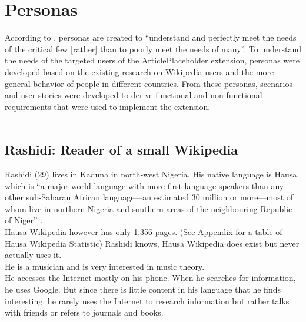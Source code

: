 \chapter{Personas}

According to \citet[182]{design:01}, personas are created to ``understand and perfectly meet the needs of the critical few [rather] than to poorly meet the needs of many''. To understand the needs of the targeted users of the ArticlePlaceholder extension, personas were developed based on the existing research on Wikipedia users \citep{wiki:37} and the more general behavior of people in different countries. From these personas, scenarios and user stories were developed to derive functional and non-functional requirements that were used to implement the extension. \\
\\
\section{Rashidi: Reader of a small Wikipedia}
Rashidi (29) lives in Kaduna in north-west Nigeria. His native language is Hausa, which is ``a major world language with more first-language speakers than any other sub-Saharan African language---an estimated 30 million or more---most of whom live in northern Nigeria and southern areas of the neighbouring Republic of Niger'' \cite[p1]{hausa}. \\
Hausa Wikipedia however has only 1,356 pages. (See Appendix for a table of Hausa Wikipedia Statistic) Rashidi knows, Hausa Wikipedia does exist but never actually uses it. \\
He is a musician and is very interested in music theory. \\
He accesses the Internet mostly on his phone. When he searches for information, he uses Google. But since there is little content in his language that he finds interesting, he rarely uses the Internet to research information but rather talks with friends or refers to journals and books.


